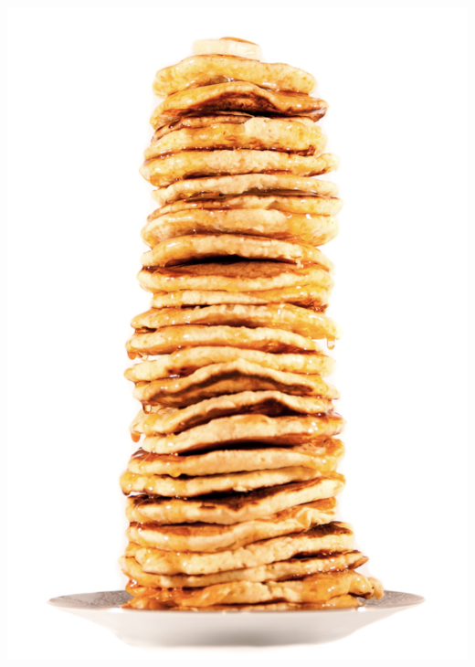 \documentclass[rgb]{beamer}
\begin{document}
\begin{frame}[fragile]
\begin{footnotesize}
\begin{minipage}[b]{0.16\textwidth}
  \includegraphics[width=1.8\textwidth]{../images/stack.png}

\end{minipage}

\end{footnotesize}
\end{frame}
\end{document}
